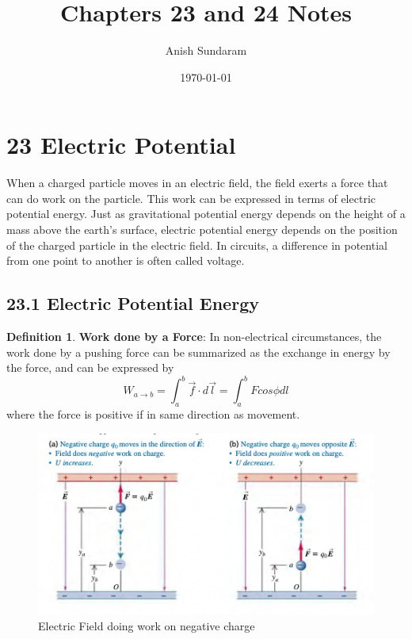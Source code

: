 \documentclass[12pt]{amsart}
\title{Chapters 23 and 24 Notes}
\author{Anish Sundaram}
\date{\today}
\theoremstyle{definition}
\newtheorem{definition}{Definition} %
\numberwithin{equation}{theorem}    %
\begin{document}
\maketitle

\tableofcontents

\section*{23 Electric Potential}
When a charged particle moves in an electric field, the field exerts a force 
that can do work on the particle. This work can be expressed in terms of 
electric potential energy. Just as gravitational potential energy depends on 
the height of a mass above the earth’s surface, electric potential energy 
depends on the position of the charged particle in the electric field. 
In circuits, a difference in potential from one point to another is often 
called voltage. 

\subsection*{23.1 Electric Potential Energy}

\begin{definition}
    \textbf{Work done by a Force}: In non-electrical circumstances, the work
    done by a pushing force can be summarized as the exchange in energy by the
    force, and can be expressed by $$W_{a\rightarrow b} = \int^{b}_{a} \vec{f} \cdot d \vec{l} = \int ^b _a Fcos\phi dl $$
    where the force is positive if in same direction as movement.
\end{definition}

\begin{figure}[H]
    \centering
    \includegraphics[width=5in]{Media/Work.png}
    \caption{Electric Field doing work on negative charge}
    \label{Electric Field doing work on negative charge}
\end{figure}
\end{document}
